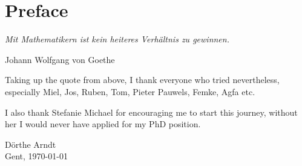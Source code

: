 \cleardoublepage

\normalsize

\chapter{Preface}
\setlength{\epigraphrule}{0pt}
\setlength{\epigraphwidth}{0.75\textwidth}
\epigraph{\textit{Mit Mathematikern ist kein heiteres Verhältnis zu gewinnen.}}{Johann Wolfgang von Goethe}

Taking up the quote from above, I thank everyone who tried nevertheless, 
especially  Miel, Jos, Ruben, Tom, Pieter Pauwels, Femke, Agfa etc.

I also thank Stefanie Michael for encouraging me to start this journey, without her I would never have applied for my PhD position. 


\vspace*{\fill}

\begin{flushright}
D\"orthe Arndt \\
Gent, \today
\end{flushright}

\vspace*{\fill}



